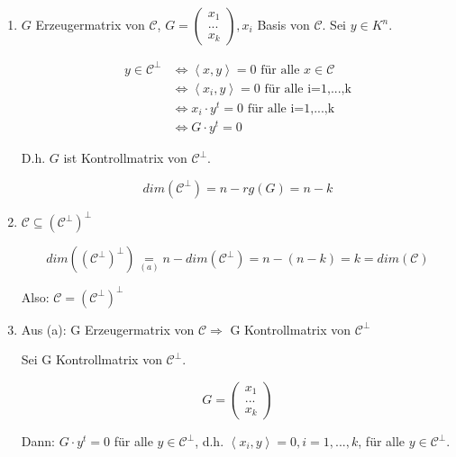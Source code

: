 \documentclass[a4paper, openany]{book}
\begin{document}
\begin{enumerate}[label=(\alph*)]
	\item $G$ Erzeugermatrix von $\mathcal{C}$, $G = \begin{pmatrix}x_1 \\ ... \\ x_k \end{pmatrix}, x_i $ Basis von $\mathcal{C}$. Sei $y \in K^n$.

	\begin{align*}
		y \in \mathcal{C}^{\perp} & \Leftrightarrow \left \langle x,y \right \rangle = 0 \text { für alle $x \in \mathcal{C}$} \\
								  & \Leftrightarrow \left \langle x_i, y \right \rangle = 0 \text{ für alle i=1,...,k} \\
								  & \Leftrightarrow x_i \cdot y^t = 0 \text{ für alle i=1,...,k} \\
								  & \Leftrightarrow G \cdot y^t = 0
	\end{align*}

	D.h. $G$ ist Kontrollmatrix von $\mathcal{C}^{\perp}$.

	\[ dim(\mathcal{C}^{\perp}) = n-rg(G) = n-k \]

	\item $\mathcal{C} \subseteq (\mathcal{C}^{\perp})^{\perp}$

	\par \medskip

	\[ dim((\mathcal{C}^{\perp})^{\perp}) \underset{(a)}{=} n-dim(\mathcal{C}^{\perp}) = n-(n-k) = k = dim(\mathcal{C}) \]

	Also: $\mathcal{C} = (\mathcal{C}^{\perp})^{\perp}$

	\item Aus (a): G Erzeugermatrix von $\mathcal{C} \Rightarrow$ G Kontrollmatrix von $\mathcal{C}^{\perp}$

	\par \medskip

	Sei G Kontrollmatrix von $\mathcal{C}^{\perp}$.

	\[ G = \begin{pmatrix}x_1 \\ ... \\ x_k \end{pmatrix} \]

	Dann: $G \cdot y^t = 0$ für alle $y \in \mathcal{C}^{\perp}$, d.h. $\left \langle x_i, y \right \rangle = 0, i=1, ..., k$, für alle $y \in \mathcal{C}^{\perp}$.

	\par \medskip


\end{enumerate}
\end{document}
